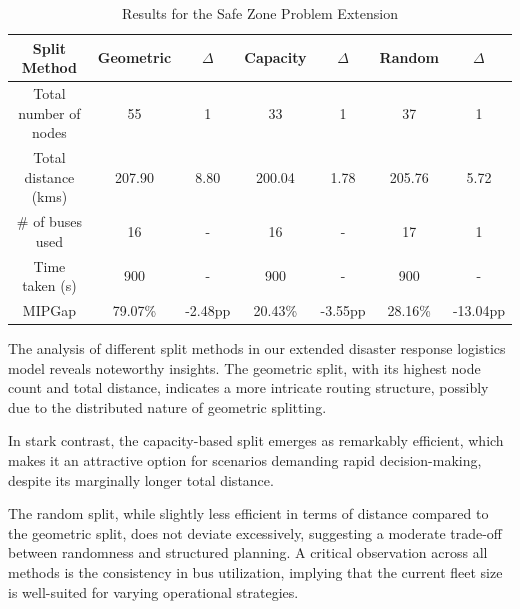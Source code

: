 \documentclass[12pt]{article}
\begin{document}
\begin{table}[htbp]
    \centering
    \begin{tabular}{|c|c|c|c|c|c|c|}
        \hline
        \textbf{Split Method} & \textbf{Geometric} & \textbf{$\Delta$ } & \textbf{Capacity} & \textbf{$\Delta$ } & \textbf{Random} & \textbf{$\Delta$ } \\
        \hline
        Total number of nodes & 55                 & 1                  & 33                & 1                  & 37              & 1                  \\
        \hline
        Total distance (kms)  & 207.90             & 8.80               & 200.04            & 1.78               & 205.76          & 5.72               \\
        \hline
        \# of buses used      & 16                 & -                  & 16                & -                  & 17              & 1                  \\
        \hline
        Time taken (s)        & 900                & -                  & 900               & -                  & 900             & -                  \\
        \hline
        MIPGap                & 79.07\%            & -2.48pp            & 20.43\%           & -3.55pp            & 28.16\%         & -13.04pp           \\
        \hline
    \end{tabular}
    \caption{Results for the Safe Zone Problem Extension}
    \label{tab:results-extension}
\end{table}

The analysis of different split methods in our extended disaster response logistics model reveals noteworthy insights. The geometric split, with its highest node count and total distance, indicates a more intricate routing structure, possibly due to the distributed nature of geometric splitting.

In stark contrast, the capacity-based split emerges as remarkably efficient, which makes it an attractive option for scenarios demanding rapid decision-making, despite its marginally longer total distance.

The random split, while slightly less efficient in terms of distance compared to the geometric split, does not deviate excessively, suggesting a moderate trade-off between randomness and structured planning. A critical observation across all methods is the consistency in bus utilization, implying that the current fleet size is well-suited for varying operational strategies.
\end{document}
